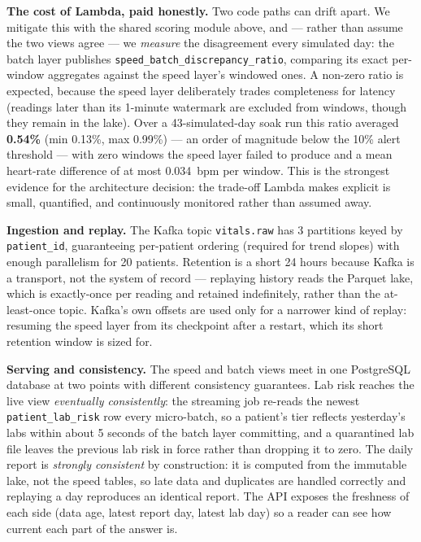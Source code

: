\documentclass[11pt,a4paper]{article}
\newcommand{\code}[1]{\texttt{\small #1}}
\begin{document}
\textbf{The cost of Lambda, paid honestly.} Two code paths can drift apart. We mitigate this with the
shared scoring module above, and --- rather than assume the two views agree --- we \emph{measure}
the disagreement every simulated day: the batch layer publishes \code{speed\_batch\_discrepancy\_ratio},
comparing its exact per-window aggregates against the speed layer's windowed ones. A non-zero ratio
is expected, because the speed layer deliberately trades completeness for latency (readings later
than its 1-minute watermark are excluded from windows, though they remain in the lake). Over a
43-simulated-day soak run this ratio averaged \textbf{0.54\%} (min 0.13\%, max 0.99\%) --- an order
of magnitude below the 10\% alert threshold --- with zero windows the speed layer failed to produce
and a mean heart-rate difference of at most 0.034~bpm per window. This is the strongest evidence for
the architecture decision: the trade-off Lambda makes explicit is small, quantified, and continuously
monitored rather than assumed away.

\textbf{Ingestion and replay.} The Kafka topic \code{vitals.raw} has 3 partitions keyed by
\code{patient\_id}, guaranteeing per-patient ordering (required for trend slopes) with enough
parallelism for 20 patients. Retention is a short 24 hours because Kafka is a transport, not the
system of record --- replaying history reads the Parquet lake, which is exactly-once per reading and
retained indefinitely, rather than the at-least-once topic. Kafka's own offsets are used only for a
narrower kind of replay: resuming the speed layer from its checkpoint after a restart, which its
short retention window is sized for.

\textbf{Serving and consistency.} The speed and batch views meet in one PostgreSQL database at two
points with different consistency guarantees. Lab risk reaches the live view \emph{eventually
consistently}: the streaming job re-reads the newest \code{patient\_lab\_risk} row every micro-batch,
so a patient's tier reflects yesterday's labs within about 5 seconds of the batch layer committing,
and a quarantined lab file leaves the previous lab risk in force rather than dropping it to zero. The
daily report is \emph{strongly consistent} by construction: it is computed from the immutable lake,
not the speed tables, so late data and duplicates are handled correctly and replaying a day
reproduces an identical report. The API exposes the freshness of each side (data age, latest report
day, latest lab day) so a reader can see how current each part of the answer is.
\end{document}
